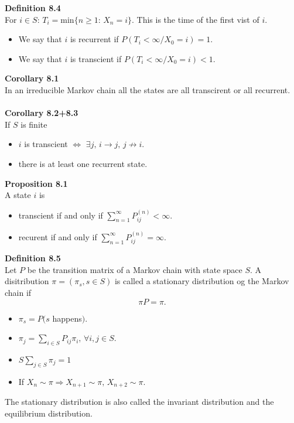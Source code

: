 \documentclass[12pt,a4paper,draft]{report}
\begin{document}
\textbf{Definition 8.4}\\
For $i\in S:\,T_i=\mathrm{min}\{n\geq 1:\,X_n=i\}$. This is the time of the first vist of $i$.
\begin{itemize}
\item We say that $i$ is recurrent if $P(T_i<\infty/X_0=i)=1$.
\item We say that $i$ is transcient if $P(T_i<\infty/X_0=i)<1$.
\end{itemize}
\textbf{Corollary 8.1}\\
In an irreducible Markov chain all the states are all transcirent or all recurrent.\\\\
\textbf{Corollary 8.2+8.3}\\
If $S$ is finite
\begin{itemize}
\setlength\itemsep{0em}
\item $i$ is transcient $\Leftrightarrow$ $\exists j,\,i\to j,\,j\not\to i$.
\item there is at least one recurrent state.
\end{itemize}
\textbf{Proposition 8.1}\\
A state $i$ is 
\begin{itemize}
\setlength\itemsep{0em}
\item transcient if and only if $\sum_{n=1}^{\infty}P_{ij}^{(n)}<\infty$.
\item recurent if and only if $\sum_{n=1}^{\infty}P_{ij}^{(n)}=\infty$.
\end{itemize}
\textbf{Definition 8.5}\\
Let $P$ be the transition matrix of a Markov chain with state space $S$. A disitribution $\pi=(\pi_s,s\in S)$ is called a stationary distribution og the Markov chain if
\begin{equation}
\pi P=\pi.
\end{equation}
\begin{itemize}
\setlength\itemsep{0em}
\item $\pi_s=P(s$ happens$)$.
\item $\pi_j=\sum_{i\in S}P_{ij}\pi_i,\,\forall i,j\in S$.
\item $S\sum_{j\in S}\pi_j=1$
\item If $X_n\sim\pi\Rightarrow X_{n+1}\sim\pi,\,X_{n+2}\sim\pi$.
\end{itemize}
The stationary distribution is also called the invariant distribution and the equilibrium distribution.\\\\
\end{document}
